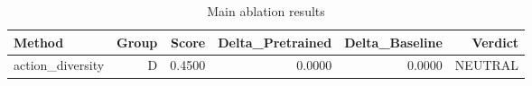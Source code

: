 \begin{table}[htbp]
\centering
\caption{Main ablation results}
\label{tab:main-results}
\begin{tabular}{lrrrrr}
\toprule
\textbf{Method} & \textbf{Group} & \textbf{Score} & \textbf{Delta\_Pretrained} & \textbf{Delta\_Baseline} & \textbf{Verdict} \\
\midrule
action\_diversity & D & 0.4500 & 0.0000 & 0.0000 & NEUTRAL \\
\bottomrule
\end{tabular}
\end{table}
